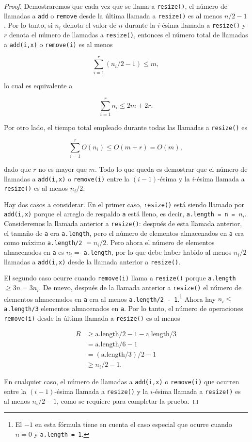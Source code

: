 \documentclass[11pt]{book}
\theoremstyle{plain}
\begin{document}
\begin{proof}
Demostraremos que cada vez que se llama a \texttt{resize()}, el número de llamadas a \texttt{add} o \texttt{remove} desde la última llamada a \texttt{resize()} es al menos $n/2 - 1$. Por lo tanto, si $n_i$ denota el valor de $n$ durante la $i$-ésima llamada a \texttt{resize()} y $r$ denota el número de llamadas a \texttt{resize()}, entonces el número total de llamadas a \texttt{add(i,x)} o \texttt{remove(i)} es al menos

$$
\sum_{i=1}^{r} (n_i / 2 - 1) \le m ,
$$

lo cual es equivalente a

$$
\sum_{i=1}^{r} n_i \le 2m + 2r .
$$

Por otro lado, el tiempo total empleado durante todas las llamadas a \texttt{resize()} es

$$
\sum_{i=1}^{r} O(n_i) \le O(m + r) = O(m) ,
$$

dado que $r$ no es mayor que $m$. Todo lo que queda es demostrar que el número de llamadas a \texttt{add(i,x)} o \texttt{remove(i)} entre la $(i-1)$-ésima y la $i$-ésima llamada a \texttt{resize()} es al menos $n_i/2$.

Hay dos casos a considerar. En el primer caso, \texttt{resize()} está siendo llamado por \texttt{add(i,x)} porque el arreglo de respaldo \texttt{a} está lleno, es decir, \texttt{a.length = n = $n_i$}. Consideremos la llamada anterior a \texttt{resize()}: después de esta llamada anterior, el tamaño de \texttt{a} era \texttt{a.length}, pero el número de elementos almacenados en \texttt{a} era como máximo \texttt{a.length/2} $= n_i/2$. Pero ahora el número de elementos almacenados en \texttt{a} es $n_i = $ \texttt{a.length}, por lo que debe haber habido al menos $n_i/2$ llamadas a \texttt{add(i,x)} desde la llamada anterior a \texttt{resize()}.

El segundo caso ocurre cuando \texttt{remove(i)} llama a \texttt{resize()} porque \texttt{a.length} $\ge 3n = 3n_i$. De nuevo, después de la llamada anterior a \texttt{resize()} el número de elementos almacenados en \texttt{a} era al menos \texttt{a.length/2 - 1}.\footnote{El $-1$ en esta fórmula tiene en cuenta el caso especial que ocurre cuando $n = 0$ y \texttt{a.length = 1}.} Ahora hay $n_i \le$ \texttt{a.length/3} elementos almacenados en \texttt{a}. Por lo tanto, el número de operaciones \texttt{remove(i)} desde la última llamada a \texttt{resize()} es al menos

$$
\begin{aligned}
R &\ge \text{a.length}/2 - 1 - \text{a.length}/3 \\
&= \text{a.length}/6 - 1 \\
&= (\text{a.length}/3)/2 - 1 \\
&\ge n_i/2 - 1 .
\end{aligned}
$$

En cualquier caso, el número de llamadas a \texttt{add(i,x)} o \texttt{remove(i)} que ocurren entre la $(i-1)$-ésima llamada a \texttt{resize()} y la $i$-ésima llamada a \texttt{resize()} es al menos $n_i/2 - 1$, como se requiere para completar la prueba.
\end{proof}
\end{document}
